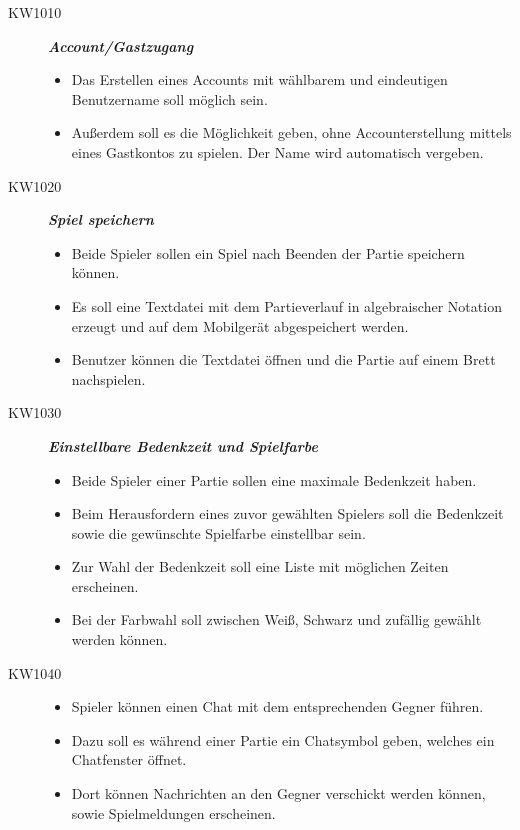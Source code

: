 \documentclass[parskip=full]{scrartcl}
\begin{document}
\begin{description}

	\item[KW1010] \textbf{\textit{Account/Gastzugang}}
	\begin{itemize}
		\item Das Erstellen eines Accounts mit wählbarem und eindeutigen Benutzername soll 		möglich sein.
		\item Außerdem soll es die Möglichkeit geben, ohne Accounterstellung mittels eines 		Gastkontos zu spielen. Der Name wird automatisch vergeben.		
	\end{itemize}
	
	\item[KW1020] \textbf{\textit{Spiel speichern}}
	\begin{itemize}
		\item Beide Spieler sollen ein Spiel nach Beenden der Partie speichern können.
		\item Es soll eine Textdatei mit dem Partieverlauf in algebraischer \gls{Notation} erzeugt und auf dem Mobilgerät abgespeichert werden.
		\item Benutzer können die Textdatei öffnen und die Partie auf einem Brett nachspielen.
	\end{itemize}
	
	\item[KW1030] \textbf{\textit{Einstellbare Bedenkzeit und Spielfarbe}}
	\begin{itemize}
		\item Beide Spieler einer Partie sollen eine maximale Bedenkzeit haben.
		\item Beim Herausfordern eines zuvor gewählten Spielers soll die Bedenkzeit sowie die gewünschte Spielfarbe einstellbar sein.
		\item Zur Wahl der Bedenkzeit soll eine Liste mit möglichen Zeiten erscheinen.
		\item Bei der Farbwahl soll zwischen Weiß, Schwarz und zufällig gewählt werden				können.
	\end{itemize}
	
	\item[KW1040] 
	\begin{itemize} \textbf{\textit{Spielerchat}}
		\item \gls{Spieler} können einen Chat mit dem entsprechenden Gegner führen.
		\item Dazu soll es während einer Partie ein Chatsymbol geben, welches ein Chatfenster öffnet.
		\item Dort können Nachrichten an den Gegner verschickt werden können, sowie Spielmeldungen erscheinen.
	\end{itemize}
	

\end{description}
\end{document}

